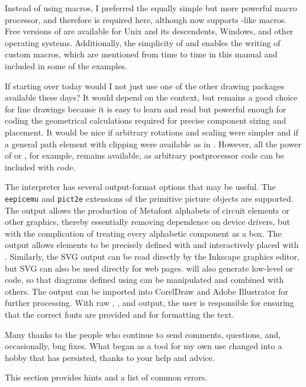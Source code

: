 Instead of using \pic macros, I preferred the equally simple but more
powerful \Mfour macro processor, and therefore \Mfour is required here,
although \dpic  now supports \pic-like macros.  Free versions of \Mfour
are available for Unix and its descendents, Windows, and other operating
systems.  Additionally, the simplicity of \Mfour and \pic enables the
writing of custom macros, which are mentioned from time to time in this
manual and included in some of the examples.

If starting over today would I not just use one of the other drawing
packages available these days?  It would depend on the context, but \pic
remains a good choice for line drawings because it is easy to learn
and read but powerful enough for coding the geometrical calculations
required for precise component sizing and placement. It would be nice
if arbitrary rotations and scaling were simpler and if a general path
element with clipping were available as in \Postscript.  However,
all the power of \Postscript or \TPGF, for example, remains available,
as arbitrary postprocessor code can be included with \pic code.

The \dpic interpreter has several output-format options that may be
useful.  The {\tt eepicemu} and {\tt pict2e} extensions of the
primitive \latex picture objects are supported.  The \mfpic output
allows the production of Metafont alphabets of circuit elements or
other graphics, thereby essentially removing dependence on device
drivers, but with the complication of treating every alphabetic
component as a \tex box.  The \xfig output allows elements to be
precisely defined with \dpic  and interactively placed with \xfig.
Similarly, the SVG output can be read directly by the Inkscape graphics
editor, but SVG can also be used directly for web pages.
\Dpic will also generate low-level \MetaPost or \Postscript code, so
that diagrams defined using \pic can be manipulated and combined with
others.  The \Postscript output can be imported into
CorelDraw
and Adobe Illustrator
for further processing.
With raw \Postscript, \PDF, and \SVG output, the user is
responsible for ensuring that the correct fonts are provided and for
formatting the text.

Many thanks to the people who continue to send comments, questions,
and, occasionally, bug fixes. What began as a tool for my own use changed
into a hobby that has persisted, thanks to your help and advice.

This section provides hints and a list of common errors.

